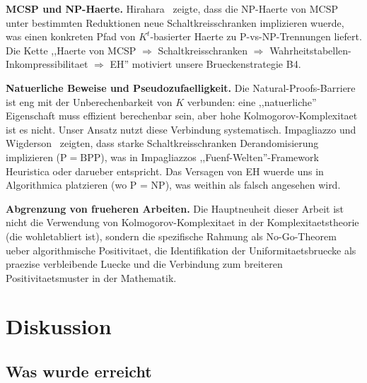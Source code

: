 \documentclass[aps,prd,twocolumn,superscriptaddress,nofootinbib]{revtex4-2}
\theoremstyle{definition}
\theoremstyle{remark}
\begin{document}
\textbf{MCSP und NP-Haerte.}
Hirahara~\cite{Hirahara2018} zeigte, dass die NP-Haerte von MCSP unter bestimmten Reduktionen neue Schaltkreisschranken implizieren wuerde, was einen konkreten Pfad von $K^t$-basierter Haerte zu P-vs-NP-Trennungen liefert. Die Kette ,,Haerte von MCSP $\Rightarrow$ Schaltkreisschranken $\Rightarrow$ Wahrheitstabellen-Inkompressibilitaet $\Rightarrow$ EH'' motiviert unsere Brueckenstrategie B4.

\textbf{Natuerliche Beweise und Pseudozufaelligkeit.}
Die Natural-Proofs-Barriere~\cite{RazborovRudich1997} ist eng mit der Unberechenbarkeit von $K$ verbunden: eine ,,natuerliche'' Eigenschaft muss effizient berechenbar sein, aber hohe Kolmogorov-Komplexitaet ist es nicht. Unser Ansatz nutzt diese Verbindung systematisch. Impagliazzo und Wigderson~\cite{ImpagliazzoWigderson1997} zeigten, dass starke Schaltkreisschranken Derandomisierung implizieren ($\mathrm{P} = \mathrm{BPP}$), was in Impagliazzos ,,Fuenf-Welten''-Framework~\cite{Impagliazzo1995} Heuristica oder darueber entspricht. Das Versagen von EH wuerde uns in Algorithmica platzieren (wo P = NP), was weithin als falsch angesehen wird.

\textbf{Abgrenzung von frueheren Arbeiten.}
Die Hauptneuheit dieser Arbeit ist nicht die Verwendung von Kolmogorov-Komplexitaet in der Komplexitaetstheorie (die wohletabliert ist), sondern die spezifische Rahmung als No-Go-Theorem ueber algorithmische Positivitaet, die Identifikation der Uniformitaetsbruecke als praezise verbleibende Luecke und die Verbindung zum breiteren Positivitaetsmuster in der Mathematik.

\section{Diskussion}
\label{sec:discussion}

\subsection{Was wurde erreicht}
\end{document}
